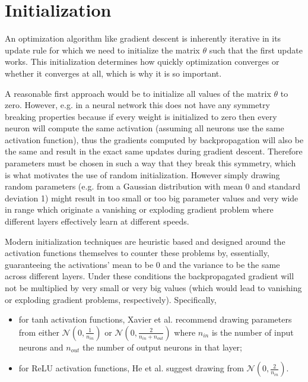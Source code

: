 \section{Initialization}

An optimization algorithm like gradient descent is inherently iterative in its update rule for which we need to initialize the matrix $\theta$ such that the first update works. This initialization determines how quickly optimization converges or whether it converges at all, which is why it is so important.

A reasonable first approach would be to initialize all values of the matrix $\theta$ to zero. However, e.g. in a neural network this does not have any symmetry breaking properties because if every weight is initialized to zero then every neuron will compute the same activation (assuming all neurons use the same activation function), thus the gradients computed by backpropagation will also be the same and result in the exact same updates during gradient descent. Therefore parameters must be chosen in such a way that they break this symmetry, which is what motivates the use of random initialization. However simply drawing random parameters (e.g. from a Gaussian distribution with mean 0 and standard deviation 1) might result in too small or too big parameter values and very wide in range which originate a vanishing or exploding gradient problem where different layers effectively learn at different speeds.

Modern initialization techniques are heuristic based and designed around the activation functions themselves to counter these problems by, essentially, guaranteeing the activations' mean to be $0$ and the variance to be the same across different layers. Under these conditions the backpropagated gradient will not be multiplied by very small or very big values (which would lead to vanishing or exploding gradient problems, respectively). Specifically,

\begin{itemize}
    \item for tanh activation functions, Xavier et al. \cite{xavierinit} recommend drawing parameters from either $\mathcal{N}(0, \frac{1}{n_{in}})$ or $\mathcal{N}(0, \frac{2}{n_{in}+n_{out}})$ where $n_{in}$ is the number of input neurons and $n_{out}$ the number of output neurons in that layer;
    \item for ReLU activation functions, He et al. \cite{heinit} suggest drawing from $\mathcal{N}(0, \frac{2}{n_{in}})$.
\end{itemize}

